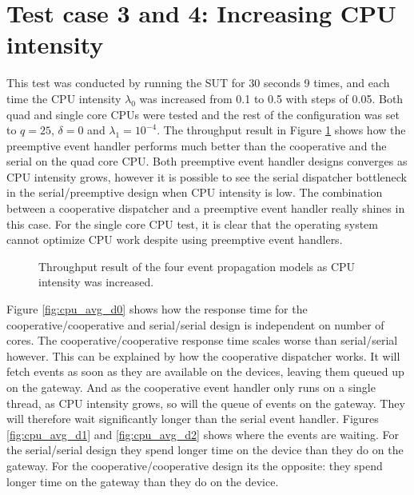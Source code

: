 \section{Test case 3 and 4: Increasing CPU intensity}

This test was conducted by running the SUT for 30 seconds 9 times, and each
time the CPU intensity $\lambda_0$ was increased from 0.1 to 0.5 with steps of
0.05. Both quad and single core CPUs were tested and the rest of the
configuration was set to $q = 25$, $\delta = 0$ and $\lambda_1 = 10^{-4}$. The
throughput result in Figure \ref{fig:cpu_throughput} shows how the preemptive
event handler performs much better than the cooperative and the serial on the
quad core CPU. Both preemptive event handler designs converges as CPU intensity
grows, however it is possible to see the serial dispatcher bottleneck in the
serial/preemptive design when CPU intensity is low. The combination between a
cooperative dispatcher and a preemptive event handler really shines in this
case. For the single core CPU test, it is clear that the operating system
cannot optimize CPU work despite using preemptive event handlers.

\begin{figure}[h!]
    \centering

    \caption[Throughput result when CPU intensity was increased.]{Throughput
    result of the four event propagation models as CPU intensity was
    increased.}

    \label{fig:cpu_throughput}
\end{figure}

Figure \ref{fig:cpu_avg_d0} shows how the response time for the
cooperative/cooperative and serial/serial design is independent on number of
cores. The cooperative/cooperative response time scales worse than
serial/serial however. This can be explained by how the cooperative dispatcher
works. It will fetch events as soon as they are available on the devices,
leaving them queued up on the gateway. And as the cooperative event handler
only runs on a single thread, as CPU intensity grows, so will the queue of
events on the gateway. They will therefore wait significantly longer than the
serial event handler. Figures \ref{fig:cpu_avg_d1} and \ref{fig:cpu_avg_d2}
shows where the events are waiting. For the serial/serial design they spend
longer time on the device than they do on the gateway. For the
cooperative/cooperative design its the opposite: they spend longer time on the
gateway than they do on the device.

